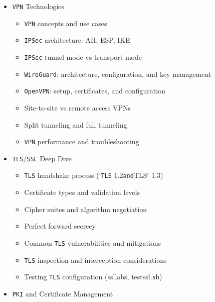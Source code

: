 \documentclass[
]{article}
\providecommand{\tightlist}{%
  \setlength{\itemsep}{0pt}\setlength{\parskip}{0pt}}
\begin{document}
\begin{itemize}
  \begin{itemize}
  \tightlist
  \item
    \texttt{IDS} vs \texttt{IPS}: concepts and deployment modes
  \item
    Signature-based detection
  \item
    Anomaly-based detection
  \item
    Network-based \texttt{IDS}/\texttt{IPS} (Snort, Suricata)
  \item
    Host-based intrusion detection
  \item
    Tuning and managing false positives
  \item
    Integration with \texttt{SIEM} platforms
  \end{itemize}
\item
  \texttt{VPN} Technologies

  \begin{itemize}
  \tightlist
  \item
    \texttt{VPN} concepts and use cases
  \item
    \texttt{IPSec} architecture: AH, ESP, IKE
  \item
    \texttt{IPSec} tunnel mode vs transport mode
  \item
    \texttt{WireGuard}: architecture, configuration, and key management
  \item
    \texttt{OpenVPN}: setup, certificates, and configuration
  \item
    Site-to-site vs remote access VPNs
  \item
    Split tunneling and full tunneling
  \item
    \texttt{VPN} performance and troubleshooting
  \end{itemize}
\item
  \texttt{TLS}/\texttt{SSL} Deep Dive

  \begin{itemize}
  \tightlist
  \item
    \texttt{TLS} handshake process (`\texttt{TLS} 1.2\texttt{and}TLS`
    1.3)
  \item
    Certificate types and validation levels
  \item
    Cipher suites and algorithm negotiation
  \item
    Perfect forward secrecy
  \item
    Common \texttt{TLS} vulnerabilities and mitigations
  \item
    \texttt{TLS} inspection and interception considerations
  \item
    Testing \texttt{TLS} configuration (ssllabs, testssl.\texttt{sh})
  \end{itemize}
\item
  \texttt{PKI} and Certificate Management


\end{itemize}
\end{document}
